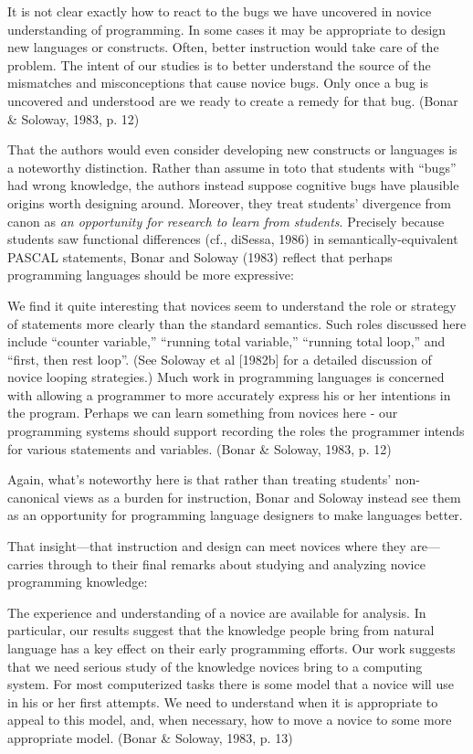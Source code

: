 It is not clear exactly how to react to the bugs we have uncovered in
novice understanding of programming. In some cases it may be appropriate
to design new languages or constructs. Often, better instruction would
take care of the problem. The intent of our studies is to better
understand the source of the mismatches and misconceptions that cause
novice bugs. Only once a bug is uncovered and understood are we ready to
create a remedy for that bug. (Bonar \& Soloway, 1983, p. 12)

That the authors would even consider developing new constructs or
languages is a noteworthy distinction. Rather than assume in toto that
students with ``bugs'' had wrong knowledge, the authors instead suppose
cognitive bugs have plausible origins worth designing around. Moreover,
they treat students' divergence from canon as \emph{an opportunity for
research to learn from students}. Precisely because students saw
functional differences (cf., diSessa, 1986) in semantically-equivalent
PASCAL statements, Bonar and Soloway (1983) reflect that perhaps
programming languages should be more expressive:

We find it quite interesting that novices seem to understand the role or
strategy of statements more clearly than the standard semantics. Such
roles discussed here include ``counter variable,'' ``running total
variable,'' ``running total loop,'' and ``first, then rest loop''. (See
Soloway et al {[}1982b{]} for a detailed discussion of novice looping
strategies.) Much work in programming languages is concerned with
allowing a programmer to more accurately express his or her intentions
in the program. Perhaps we can learn something from novices here - our
programming systems should support recording the roles the programmer
intends for various statements and variables. (Bonar \& Soloway, 1983,
p. 12)

Again, what's noteworthy here is that rather than treating students'
non-canonical views as a burden for instruction, Bonar and Soloway
instead see them as an opportunity for programming language designers to
make languages better.

That insight---that instruction and design can meet novices where they
are---carries through to their final remarks about studying and
analyzing novice programming knowledge:

The experience and understanding of a novice are available for analysis.
In particular, our results suggest that the knowledge people bring from
natural language has a key effect on their early programming efforts.
Our work suggests that we need serious study of the knowledge novices
bring to a computing system. For most computerized tasks there is some
model that a novice will use in his or her first attempts. We need to
understand when it is appropriate to appeal to this model, and, when
necessary, how to move a novice to some more appropriate model. (Bonar
\& Soloway, 1983, p. 13)

